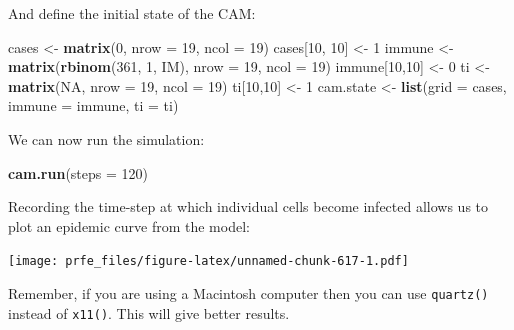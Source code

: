 \documentclass[12pt,a4paper]{book}
\newenvironment{Shaded}{\begin{snugshade}}{\end{snugshade}}
\newcommand{\KeywordTok}[1]{\textcolor[rgb]{0.13,0.29,0.53}{\textbf{#1}}}
\newcommand{\DataTypeTok}[1]{\textcolor[rgb]{0.13,0.29,0.53}{#1}}
\newcommand{\DecValTok}[1]{\textcolor[rgb]{0.00,0.00,0.81}{#1}}
\newcommand{\StringTok}[1]{\textcolor[rgb]{0.31,0.60,0.02}{#1}}
\newcommand{\OtherTok}[1]{\textcolor[rgb]{0.56,0.35,0.01}{#1}}
\newcommand{\OperatorTok}[1]{\textcolor[rgb]{0.81,0.36,0.00}{\textbf{#1}}}
\newcommand{\NormalTok}[1]{#1}
\theoremstyle{definition}
\theoremstyle{definition}
\theoremstyle{definition}
\theoremstyle{remark}
\begin{document}
And define the initial state of the CAM:

\begin{Shaded}
\begin{Highlighting}[]
\NormalTok{cases <-}\StringTok{ }\KeywordTok{matrix}\NormalTok{(}\DecValTok{0}\NormalTok{, }\DataTypeTok{nrow =} \DecValTok{19}\NormalTok{, }\DataTypeTok{ncol =} \DecValTok{19}\NormalTok{)}
\NormalTok{cases[}\DecValTok{10}\NormalTok{, }\DecValTok{10}\NormalTok{] <-}\StringTok{ }\DecValTok{1}
\NormalTok{immune <-}\StringTok{ }\KeywordTok{matrix}\NormalTok{(}\KeywordTok{rbinom}\NormalTok{(}\DecValTok{361}\NormalTok{, }\DecValTok{1}\NormalTok{, IM), }\DataTypeTok{nrow =} \DecValTok{19}\NormalTok{, }\DataTypeTok{ncol =} \DecValTok{19}\NormalTok{)}
\NormalTok{immune[}\DecValTok{10}\NormalTok{,}\DecValTok{10}\NormalTok{] <-}\StringTok{ }\DecValTok{0}
\NormalTok{ti <-}\StringTok{ }\KeywordTok{matrix}\NormalTok{(}\OtherTok{NA}\NormalTok{, }\DataTypeTok{nrow =} \DecValTok{19}\NormalTok{, }\DataTypeTok{ncol =} \DecValTok{19}\NormalTok{)}
\NormalTok{ti[}\DecValTok{10}\NormalTok{,}\DecValTok{10}\NormalTok{] <-}\StringTok{ }\DecValTok{1}
\NormalTok{cam.state <-}\StringTok{ }\KeywordTok{list}\NormalTok{(}\DataTypeTok{grid =}\NormalTok{ cases, }\DataTypeTok{immune =}\NormalTok{ immune, }\DataTypeTok{ti =}\NormalTok{ ti)}
\end{Highlighting}
\end{Shaded}

We can now run the simulation:

\begin{Shaded}
\begin{Highlighting}[]
\KeywordTok{cam.run}\NormalTok{(}\DataTypeTok{steps =} \DecValTok{120}\NormalTok{)}
\end{Highlighting}
\end{Shaded}

Recording the time-step at which individual cells become infected allows
us to plot an epidemic curve from the model:

\begin{Shaded}
\end{Shaded}

\texttt{[image: prfe\_files/figure-latex/unnamed-chunk-617-1.pdf]}

Remember, if you are using a Macintosh computer then you can use
\texttt{quartz()} instead of \texttt{x11()}. This will give better
results.
\end{document}
